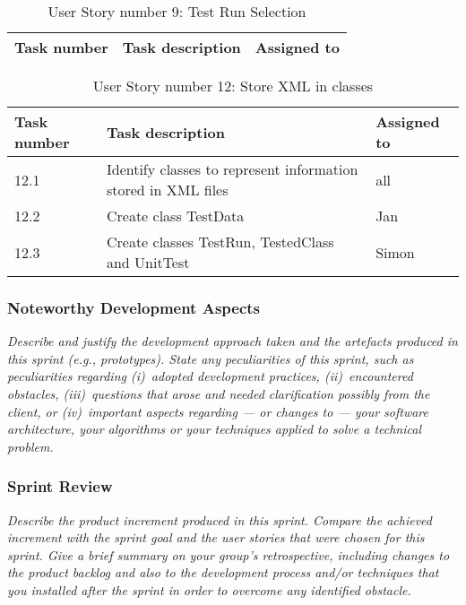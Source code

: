 \begin{table}[h]
  \caption{User Story number 9: Test Run Selection}
  \label{US_Selection}
  \centering
  \begin{tabular}{p{1.5cm}|p{9cm}|p{3cm}|}
  	Task number & Task description & Assigned to \\ 
  	\hline
  	\hline
  	\hline
  \end{tabular}
\end{table} 

\begin{table}[h]
  \caption{User Story number 12: Store XML in classes}
  \label{US_Storage}
  \centering
  \begin{tabular}{p{1.5cm}|p{9cm}|p{3cm}|}
  	Task number & Task description & Assigned to \\ 
  	\hline
  	\hline
  	12.1 & Identify classes to represent information stored in XML files & all \\ 
  	\hline
  	12.2 & Create class TestData & Jan \\ 
  	\hline
  	12.3 & Create classes TestRun, TestedClass and UnitTest & Simon \\ 
  	\hline
  \end{tabular}
\end{table} 

\subsubsection*{Noteworthy Development Aspects}

\emph{Describe and justify the development approach taken and the artefacts produced in this sprint (e.g., prototypes).  State any peculiarities of this sprint, such as peculiarities  regarding (i)~adopted development practices, (ii)~encountered obstacles, (iii)~questions that arose and needed clarification possibly from the client, or (iv)~important aspects regarding --- or changes to --- your software architecture, your algorithms or your techniques applied to solve a technical problem.}

\subsubsection*{Sprint Review}

\emph{Describe the product increment produced in this sprint. Compare the achieved increment with the sprint goal and the user stories that were chosen for this sprint. Give a brief summary on your group's retrospective, including changes to the product backlog and also to the development process and/or techniques that you installed after the sprint in order to overcome any identified obstacle.}
